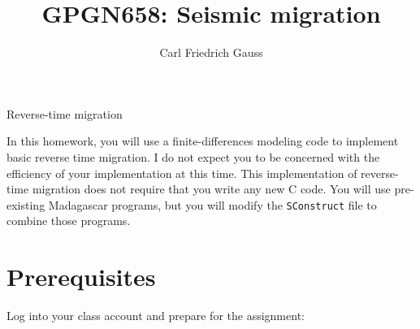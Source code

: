 \author{Carl Friedrich Gauss}
\title{GPGN658: Seismic migration}{Reverse-time migration}

In this homework, you will use a finite-differences modeling code
to implement
basic reverse time migration. I do not expect you to be concerned with
the efficiency of your implementation at this time. This
implementation of reverse-time migration does not require that you
write any new C code. You will use pre-existing Madagascar programs,
but you will modify the \texttt{SConstruct} file to combine those
programs.


\section{Prerequisites}

Log into your class account and prepare for the assignment:

